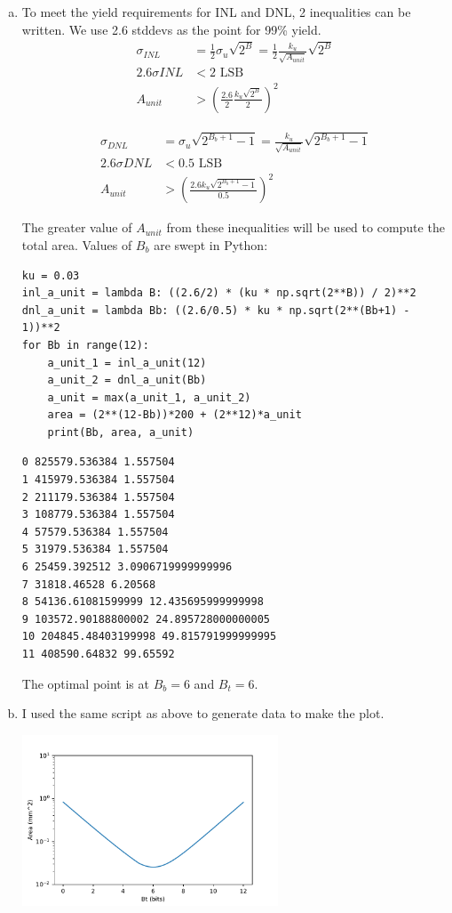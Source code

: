 \documentclass[11pt]{article}
\begin{document}
\begin{enumerate}[a)]
  \item To meet the yield requirements for INL and DNL, 2 inequalities can be written. We use 2.6 stddevs as the point for 99\% yield.
\begin{align*}
  \sigma_{INL} &= \frac{1}{2} \sigma_u \sqrt{2^B} = \frac{1}{2} \frac{k_u}{\sqrt{A_{unit}}} \sqrt{2^B} \\
  2.6 \sigma{INL} &< 2 \text{ LSB} \\
  A_{unit} &> \left( \frac{2.6}{2} \frac{k_u \sqrt{2^B}}{2} \right)^2
\end{align*}

\begin{align*}
  \sigma_{DNL} &= \sigma_u \sqrt{2^{B_b + 1} - 1} = \frac{k_u}{\sqrt{A_{unit}}} \sqrt{2^{B_b + 1} - 1}\\
  2.6 \sigma{DNL} &< 0.5 \text{ LSB} \\
  A_{unit} &> \left( \frac{2.6 k_u \sqrt{2^{B_b + 1} - 1}}{0.5} \right)^2
\end{align*}

The greater value of $A_{unit}$ from these inequalities will be used to compute the total area.
Values of $B_b$ are swept in Python:

\begin{verbatim}
ku = 0.03
inl_a_unit = lambda B: ((2.6/2) * (ku * np.sqrt(2**B)) / 2)**2
dnl_a_unit = lambda Bb: ((2.6/0.5) * ku * np.sqrt(2**(Bb+1) - 1))**2
for Bb in range(12):
    a_unit_1 = inl_a_unit(12)
    a_unit_2 = dnl_a_unit(Bb)
    a_unit = max(a_unit_1, a_unit_2)
    area = (2**(12-Bb))*200 + (2**12)*a_unit
    print(Bb, area, a_unit)
\end{verbatim}

\begin{verbatim}
0 825579.536384 1.557504
1 415979.536384 1.557504
2 211179.536384 1.557504
3 108779.536384 1.557504
4 57579.536384 1.557504
5 31979.536384 1.557504
6 25459.392512 3.0906719999999996
7 31818.46528 6.20568
8 54136.61081599999 12.435695999999998
9 103572.90188800002 24.895728000000005
10 204845.48403199998 49.815791999999995
11 408590.64832 99.65592
\end{verbatim}

The optimal point is at $B_b = 6$ and $B_t = 6$.

\item I used the same script as above to generate data to make the plot.
  \begin{center}
    \includegraphics[width=0.6\textwidth]{figs/problem2.pdf}
  \end{center}
\end{enumerate}
\end{document}
